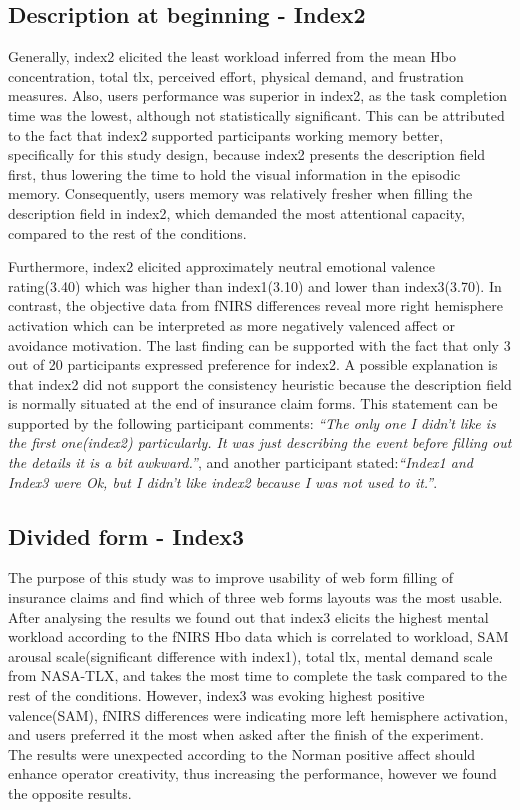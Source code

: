 \documentclass[a4paper]{report}
\begin{document}
		\subsection{Description at beginning - Index2}
			Generally, index2 elicited the least workload inferred from the mean Hbo concentration, total tlx, perceived effort, physical demand, and frustration measures. Also, users performance was superior in index2, as the task completion time was the lowest, although not statistically significant. This can be attributed to the fact that index2 supported participants working memory better, specifically for this study design, because index2 presents the description field first, thus lowering the time to hold the visual information in the episodic memory. Consequently, users memory was relatively fresher when filling the description field in index2, which demanded the most attentional capacity, compared to the rest of the conditions. 
		
			Furthermore, index2 elicited approximately neutral emotional valence rating(3.40) which was higher than index1(3.10) and lower than index3(3.70). In contrast, the objective data from fNIRS differences reveal more right hemisphere activation which can be interpreted as more negatively valenced affect or avoidance motivation. The last finding can be supported with the fact that only 3 out of 20 participants expressed preference for index2. A possible explanation is that index2 did not support the consistency heuristic\cite{nielsen1990heuristic,shneiderman1992designing} because the description field is normally situated at the end of insurance claim forms. This statement can be supported by the following participant comments: \textit{``The only one I didn't like is the first one(index2) particularly. It was just describing the event before filling out the details it is a bit awkward.''}, and another participant stated:\textit{``Index1 and Index3 were Ok, but I didn't like index2 because I was not used to it.''}.
				
		\subsection{Divided form - Index3}
			The purpose of this study was to improve usability of web form filling of insurance claims and find which of three web forms layouts was the most usable. After analysing the results we found out that index3 elicits the highest mental workload according to the fNIRS Hbo data which is correlated to workload, SAM arousal scale(significant difference with index1), total tlx, mental demand scale from NASA-TLX, and takes the most time to complete the task compared to the rest of the conditions. However, index3 was evoking highest positive valence(SAM), fNIRS differences were indicating more left hemisphere activation, and users preferred it the most when asked after the finish of the experiment. The results were unexpected according to the Norman\cite{norman2002emotion} positive affect should enhance operator creativity, thus increasing the performance, however we found the opposite results. 
		
\end{document}
